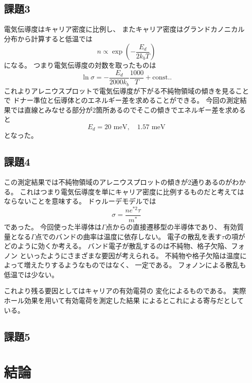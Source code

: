 \documentclass[11pt,dvipdfmx,a4paper]{jsarticle}
\begin{document}
\subsection*{課題3}
電気伝導度はキャリア密度に比例し、
またキャリア密度はグランドカノニカル分布から計算すると低温では
\begin{equation}
    n \propto \exp(-\frac{E_d}{2k_bT})
\end{equation}
になる。
つまり電気伝導度の対数を取ったものは
\begin{equation}
    \ln \sigma = -\frac{E_d}{2000k_b} \frac{1000}{T} + \text{const.}.
\end{equation}
これよりアレニウスプロットで電気伝導度が下がる不純物領域の傾きを見ることで
ドナー準位と伝導体とのエネルギー差を求めることができる。
今回の測定結果では直線とみなせる部分が2箇所あるのでそこの傾きでエネルギー差を求めると
\begin{equation}
    E_d = 20 \text{ meV},\quad 1.57 \text{ meV}
\end{equation}
となった。

\subsection*{課題4}
この測定結果では不純物領域のアレニウスプロットの傾きが2通りあるのがわかる。
これはつまり電気伝導度を単にキャリア密度に比例するものだと考えてはならないことを意味する。
ドゥルーデモデルでは
\begin{equation}
    \sigma = \frac{ne^{*2}\tau}{m^*}
\end{equation}
であった。
今回使った半導体は\(\Gamma\)点からの直接遷移型の半導体であり、
有効質量となる\(\Gamma\)点でのバンドの曲率は温度に依存しない。
電子の散乱を表す\(\tau\)の項がどのように効くか考える。
バンド電子が散乱するのは不純物、格子欠陥、フォノン
といったようにさまざまな要因が考えられる。
不純物や格子欠陥は温度によって増えたりするようなものではなく、
一定である。
フォノンによる散乱も低温では少ない。

これより残る要因としてはキャリアの有効電荷の
変化によるものである。
実際ホール効果を用いて有効電荷を測定した結果\cite{Hung-1950}\cite{Fritzsche-1958}
によるとこれによる寄与だとしている。

\subsection*{課題5}


\section{結論}
\end{document}
